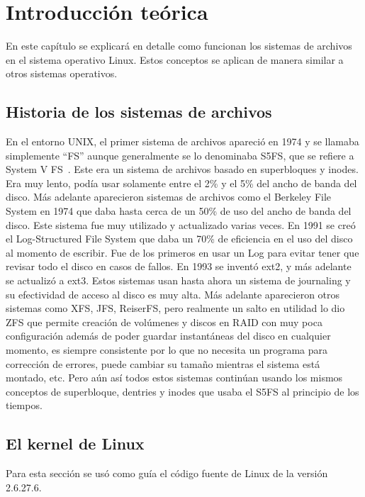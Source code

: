 \chapter{Introducción teórica}

En este capítulo se explicará en detalle como funcionan los sistemas de archivos en el sistema operativo Linux. Estos conceptos se aplican de manera similar a otros sistemas operativos.


\section{Historia de los sistemas de archivos}

En el entorno UNIX, el primer sistema de archivos apareció en 1974 y se llamaba simplemente ``FS'' aunque generalmente se lo denominaba S5FS, que se refiere a System V FS~\cite{history:website}. Este era un sistema de archivos basado en superbloques y inodes. Era muy lento, podía usar solamente entre el 2\% y el 5\% del ancho de banda del disco. Más adelante aparecieron sistemas de archivos como el Berkeley File System en 1974 que daba hasta cerca de un 50\% de uso del ancho de banda del disco. Este sistema fue muy utilizado y actualizado varias veces. En 1991 se creó el Log-Structured File System que daba un 70\% de eficiencia en el uso del disco al momento de escribir. Fue de los primeros en usar un Log para evitar tener que revisar todo el disco en casos de fallos. En 1993 se inventó ext2, y más adelante se actualizó a ext3. Estos sistemas usan hasta ahora un sistema de journaling y su efectividad de acceso al disco es muy alta. Más adelante aparecieron otros sistemas como XFS, JFS, ReiserFS, pero realmente un salto en utilidad lo dio ZFS que permite creación de volúmenes y discos en RAID con muy poca configuración además de poder guardar instantáneas del disco en cualquier momento, es siempre consistente por lo que no necesita un programa para corrección de errores, puede cambiar su tamaño mientras el sistema está montado, etc. Pero aún así todos estos sistemas continúan usando los mismos conceptos de superbloque, dentries y inodes que usaba el S5FS al principio de los tiempos.


\section{El kernel de Linux}

Para esta sección se usó como guía el código fuente de Linux de la versión 2.6.27.6.~\cite{linuxsource:website}

